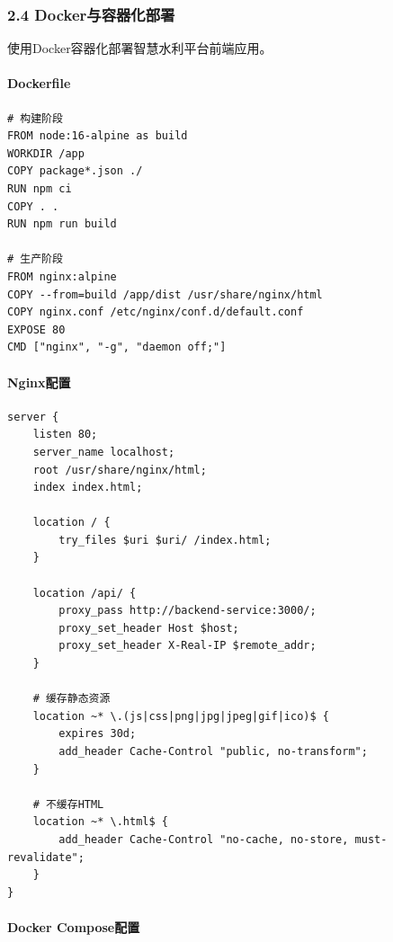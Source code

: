 \subsubsection{2.4
Docker与容器化部署}\label{dockerux4e0eux5bb9ux5668ux5316ux90e8ux7f72}

使用Docker容器化部署智慧水利平台前端应用。

\paragraph{Dockerfile}\label{dockerfile}

\begin{lstlisting}
# 构建阶段
FROM node:16-alpine as build
WORKDIR /app
COPY package*.json ./
RUN npm ci
COPY . .
RUN npm run build

# 生产阶段
FROM nginx:alpine
COPY --from=build /app/dist /usr/share/nginx/html
COPY nginx.conf /etc/nginx/conf.d/default.conf
EXPOSE 80
CMD ["nginx", "-g", "daemon off;"]
\end{lstlisting}

\paragraph{Nginx配置}\label{nginxux914dux7f6e}

\begin{lstlisting}
server {
    listen 80;
    server_name localhost;
    root /usr/share/nginx/html;
    index index.html;
    
    location / {
        try_files $uri $uri/ /index.html;
    }
    
    location /api/ {
        proxy_pass http://backend-service:3000/;
        proxy_set_header Host $host;
        proxy_set_header X-Real-IP $remote_addr;
    }
    
    # 缓存静态资源
    location ~* \.(js|css|png|jpg|jpeg|gif|ico)$ {
        expires 30d;
        add_header Cache-Control "public, no-transform";
    }
    
    # 不缓存HTML
    location ~* \.html$ {
        add_header Cache-Control "no-cache, no-store, must-revalidate";
    }
}
\end{lstlisting}

\paragraph{Docker Compose配置}\label{docker-composeux914dux7f6e}

